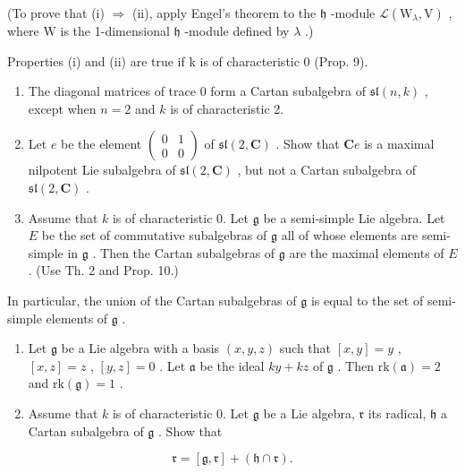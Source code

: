 (To prove that (i) \(\Longrightarrow\) (ii), apply Engel's theorem to the \(\mathfrak{h}\) -module \(\mathcal{L}(\mathrm{W}_{\lambda},\mathrm{V})\) , where \(\mathrm{W}\) is the 1-dimensional \(\mathfrak{h}\) -module defined by \(\lambda\) .)

Properties (i) and (ii) are true if k is of characteristic 0 (Prop. 9).


\begin{enumerate}
\def\labelenumi{\arabic{enumi})}
\item
  The diagonal matrices of trace 0 form a Cartan subalgebra of \(\mathfrak{sl}(n,k)\) , except when \(n = 2\) and \(k\) is of characteristic 2.
\item
  Let \(e\) be the element \(\begin{pmatrix} 0 & 1 \\ 0 & 0 \end{pmatrix}\) of \(\mathfrak{sl}(2, \mathbf{C})\) . Show that \(\mathbf{C}e\) is a maximal nilpotent Lie subalgebra of \(\mathfrak{sl}(2, \mathbf{C})\) , but not a Cartan subalgebra of \(\mathfrak{sl}(2, \mathbf{C})\) .
\item
  Assume that \(k\) is of characteristic 0. Let \(\mathfrak{g}\) be a semi-simple Lie algebra. Let \(E\) be the set of commutative subalgebras of \(\mathfrak{g}\) all of whose elements are semi-simple in \(\mathfrak{g}\) . Then the Cartan subalgebras of \(\mathfrak{g}\) are the maximal elements of \(E\) . (Use Th. 2 and Prop. 10.)
\end{enumerate}

In particular, the union of the Cartan subalgebras of \(\mathfrak{g}\) is equal to the set of semi-simple elements of \(\mathfrak{g}\) .

\begin{enumerate}
\def\labelenumi{\arabic{enumi})}
\setcounter{enumi}{3}
\item
  Let \(\mathfrak{g}\) be a Lie algebra with a basis \((x,y,z)\) such that \([x,y] = y\) , \([x,z] = z\) , \([y,z] = 0\) . Let \(\mathfrak{a}\) be the ideal \(ky + kz\) of \(\mathfrak{g}\) . Then \(\mathrm{rk}(\mathfrak{a}) = 2\) and \(\mathrm{rk}(\mathfrak{g}) = 1\) .
\item
  Assume that \(k\) is of characteristic 0. Let \(\mathfrak{g}\) be a Lie algebra, \(\mathfrak{r}\) its radical, \(\mathfrak{h}\) a Cartan subalgebra of \(\mathfrak{g}\) . Show that
\end{enumerate}

\[
\mathfrak {r} = [ \mathfrak {g}, \mathfrak {r} ] + (\mathfrak {h} \cap \mathfrak {r}).
\]

